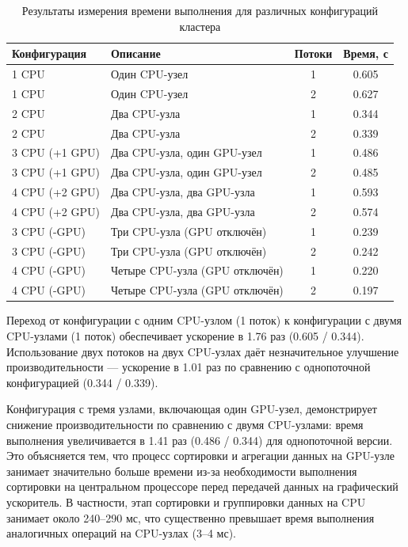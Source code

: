 \documentclass[areaset=advanced]{scrartcl}
\begin{document}
\begin{table}[ht]
\centering
\label{tab:res}
\begin{tabularx}{\textwidth}{lXcc}
\toprule
Конфигурация & Описание & Потоки & Время, с \\
\midrule
1 CPU & Один CPU-узел & 1 & 0.605 \\
1 CPU & Один CPU-узел & 2 & 0.627 \\
2 CPU & Два CPU-узла & 1 & 0.344 \\
2 CPU & Два CPU-узла & 2 & 0.339 \\
3 CPU (+1 GPU) & Два CPU-узла, один GPU-узел & 1 & 0.486 \\
3 CPU (+1 GPU) & Два CPU-узла, один GPU-узел & 2 & 0.485 \\
4 CPU (+2 GPU) & Два CPU-узла, два GPU-узла & 1 & 0.593 \\
4 CPU (+2 GPU) & Два CPU-узла, два GPU-узла & 2 & 0.574 \\
3 CPU (-GPU) & Три CPU-узла (GPU отключён) & 1 & 0.239 \\
3 CPU (-GPU) & Три CPU-узла (GPU отключён) & 2 & 0.242 \\
4 CPU (-GPU) & Четыре CPU-узла (GPU отключён) & 1 & 0.220 \\
4 CPU (-GPU) & Четыре CPU-узла (GPU отключён) & 2 & 0.197 \\
\bottomrule
\end{tabularx}
\caption{Результаты измерения времени выполнения для различных конфигураций кластера}
\end{table}

Переход от конфигурации с одним CPU-узлом (1 поток) к конфигурации с двумя CPU-узлами (1 поток) обеспечивает ускорение в 1.76 раз (0.605 / 0.344). Использование двух потоков на двух CPU-узлах даёт незначительное улучшение производительности — ускорение в 1.01 раз по сравнению с однопоточной конфигурацией (0.344 / 0.339).

Конфигурация с тремя узлами, включающая один GPU-узел, демонстрирует снижение производительности по сравнению с двумя CPU-узлами: время выполнения увеличивается в 1.41 раз (0.486 / 0.344) для однопоточной версии. Это объясняется тем, что процесс сортировки и агрегации данных на GPU-узле занимает значительно больше времени из-за необходимости выполнения сортировки на центральном процессоре перед передачей данных на графический ускоритель. В частности, этап сортировки и группировки данных на CPU занимает около 240–290 мс, что существенно превышает время выполнения аналогичных операций на CPU-узлах (3–4 мс).
\end{document}
